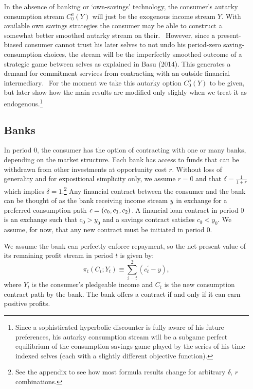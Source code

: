 \documentclass[11pt]{article}%
\begin{document}
In the absence of banking or `own-savings' technology, the consumer's autarky
consumption stream $C_{0}^{a}(Y)$ will just be the exogenous income stream
$Y.$ With available own savings strategies the consumer may be able to
construct a somewhat better smoothed autarky stream on their. \ However, since
a present-biased consumer cannot trust his later selves to not undo his
period-zero saving-consumption choices, the stream will be the imperfectly
smoothed outcome of a strategic game between selves as explained in Basu
(2014). This generates a demand for commitment services from contracting with
$\text{}$an outside financial intermediary. \ For the moment we take this
autarky option $C_{0}^{a}(Y)$ to be given, but later show how the main results
are modified only slighly when we treat it as endogenous.\footnote{Since a
sophisticated hyperbolic discounter is fully aware of his future preferences,
his autarky consumption stream will be a subgame perfect equilibrium of the
consumption-savings game played by the series of his time-indexed selves (each
with a slightly different objective function).}

\subsection{Banks}

In period $0$, the consumer has the option of contracting with one or many
banks, depending on the market structure. Each bank has access to funds that
can be withdrawn from other investments at opportunity cost $r$. Without loss
of generality and for expositional simplicity only, we assume $r=0$ and that
$\delta=\frac{1}{1+r}$ which implies $\delta=1$.\footnote{See the appendix to
see how most formula results change for arbitrary $\delta$, $r$ combinations.}
Any financial contract between the consumer and the bank can be thought of as
the bank receiving income stream $\emph{y}$ in exchange for a preferred
consumption path $\emph{c}=\left(  c_{0},c_{1},c_{2}\right)  $. A financial
loan contract in period 0 is an exchange such that $c_{0}>y_{0}$ and a savings
contract satisfies $c_{0}<y_{0}$. We assume, for now, that any new contract
must be initiated in period 0.

We assume the bank can perfectly enforce repayment, so the net present value
of its remaining profit stream in period $t$ is given by:%
\[
\pi_{t}\left(  C_{t};Y_{t}\right)  \equiv\sum\limits_{i=t}^{2}\left(
c_{t}^{\prime}-y\right)  ,
\]
where $Y_{t}$ is the consumer's pledgeable income and $C_{t}$ is the new
consumption contract path by the bank. The bank offers a contract if and only
if it can earn positive profits.
\end{document}
